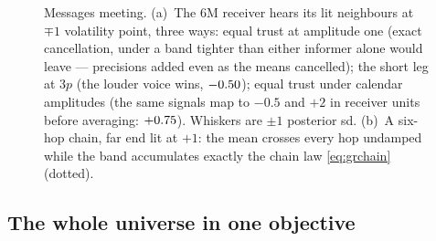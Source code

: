 \begin{figure}[htbp]
\centering
{}
\caption{Messages meeting.  (a)~The 6M receiver hears its lit
neighbours at $\mp1$ volatility point, three ways: equal trust at
amplitude one (exact cancellation, under a band tighter than either
informer alone would leave --- precisions added even as the means
cancelled); the short leg at $3p$ (the louder voice wins,
$-0.50$); equal trust under calendar amplitudes (the same
signals map to $-0.5$ and $+2$ in receiver units before averaging:
$+0.75$).  Whiskers are $\pm1$ posterior sd.  (b)~A six-hop
chain, far end lit at $+1$: the mean crosses every hop undamped while
the band accumulates exactly the chain law \cref{eq:grchain} (dotted).}
\label{fig:grmeet}
\end{figure}

\subsection{The whole universe in one objective}

